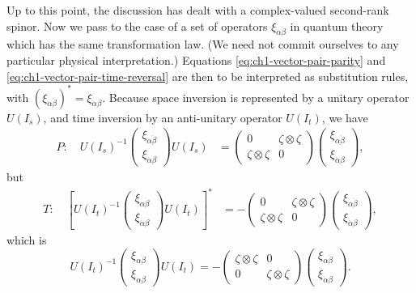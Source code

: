 Up to this point, the discussion has dealt with a complex-valued second-rank
spinor. Now we pass to the case of a set of operators
$\xi_{\alpha\dot\beta}$ in quantum theory which has the same transformation
law. (We need not commit ourselves to any particular physical
interpretation.) Equations \eqref{eq:ch1-vector-pair-parity} and \eqref{eq:ch1-vector-pair-time-reversal} are then to be interpreted as
substitution rules, with $(\xi_{\alpha\dot\beta})^*=\xi_{\dot\alpha\beta}$.
Because space inversion is represented by a unitary operator $U(I_s)$, and
time inversion by an anti-unitary operator $U(I_t)$, we have
\begin{equation}
\begin{aligned}
  P:\quad
  U(I_s)^{-1}
  \begin{pmatrix}
    \xi_{\alpha\dot\beta}\\
    \xi_{\dot\alpha\beta}
  \end{pmatrix}
  U(I_s)
  &=
  \begin{pmatrix}
    0&\zeta\otimes\zeta\\
    \zeta\otimes\zeta&0
  \end{pmatrix}
  \begin{pmatrix}
    \xi_{\alpha\dot\beta}\\
    \xi_{\dot\alpha\beta}
  \end{pmatrix},
\end{aligned}
\tag{1-39}\label{eq:ch1-operator-parity}
\end{equation}
but
\[
\begin{aligned}
  T:\quad
  \left[
  U(I_t)^{-1}
  \begin{pmatrix}
    \xi_{\alpha\dot\beta}\\
    \xi_{\dot\alpha\beta}
  \end{pmatrix}
  U(I_t)\right]^*
  &=
  -
  \begin{pmatrix}
    0&\zeta\otimes\zeta\\
    \zeta\otimes\zeta&0
  \end{pmatrix}
  \begin{pmatrix}
    \xi_{\alpha\dot\beta}\\
    \xi_{\dot\alpha\beta}
  \end{pmatrix},
\end{aligned}
\]
which is
\begin{equation}
  U(I_t)^{-1}
  \begin{pmatrix}
    \xi_{\alpha\dot\beta}\\
    \xi_{\dot\alpha\beta}
  \end{pmatrix}
  U(I_t)
  =
  -
  \begin{pmatrix}
    \zeta\otimes\zeta&0\\
    0&\zeta\otimes\zeta
  \end{pmatrix}
  \begin{pmatrix}
    \xi_{\alpha\dot\beta}\\
    \xi_{\dot\alpha\beta}
  \end{pmatrix}.
  \tag{1-40}\label{eq:ch1-operator-time-reversal}
\end{equation}

